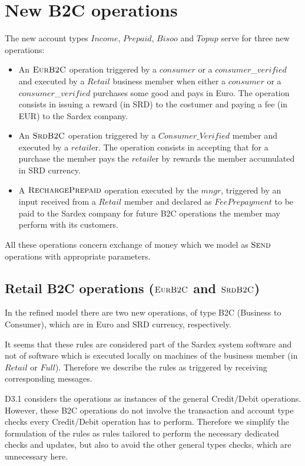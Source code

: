 \section{New B2C operations}
\label{sect:userops}

The new account types $Income$, $Prepaid$, $Bisoo$ and $Topup$ serve for three new operations:
\begin{itemize}
	\item An $\hbox{\sc EurB2C}$ operation triggered by a $consumer$ or a $consumer$\_$verified$ and executed by a $Retail$ business member when either a $consumer$ or a $consumer$\_$verified$ purchases some good and pays in Euro. The operation consists in issuing a reward (in SRD) to the costumer and paying a fee (in EUR) to the Sardex company.
		
	\item An $\hbox{\sc SrdB2C}$ operation triggered by a $Consumer\_Verified$ member and executed by a $retail$er. The operation consists in accepting that for a purchase the member pays the $retail$er by rewards the member accumulated in SRD currency. 
	
	\item  A $\hbox{\sc RechargePrepaid}$ operation executed by the $mngr$, triggered by an input received from a $Retail$ member and declared as $FeePrepayment$ to be paid to the Sardex company for future B2C operations the member may perform with its customers.
	\end{itemize}
All these operations concern exchange of money which we model as $\hbox{\sc Send}$ operations with appropriate parameters.


\subsection{Retail B2C operations ($\hbox{\sc EurB2C}$ and $\hbox{\sc SrdB2C}$)}
\label{sect:eurob2c}

In the refined model there are two new operations, of type B2C (Business to 
Consumer), which are in Euro and SRD currency, respectively.

It seems that these rules are considered part of the Sardex system software and not of software which is executed locally on machines of the business member (in $Retail$ or $Full$). Therefore we describe the rules as triggered by receiving corresponding messages.

D3.1 considers the operations as instances of the general Credit/Debit operations. However, these B2C operations do not involve the transaction and account type checks every Credit/Debit operation has to perform. Therefore we simplify the formulation of the rules as rules tailored to perform the necessary dedicated checks and updates, but also to avoid the other general types checks, which are unnecessary here. 

